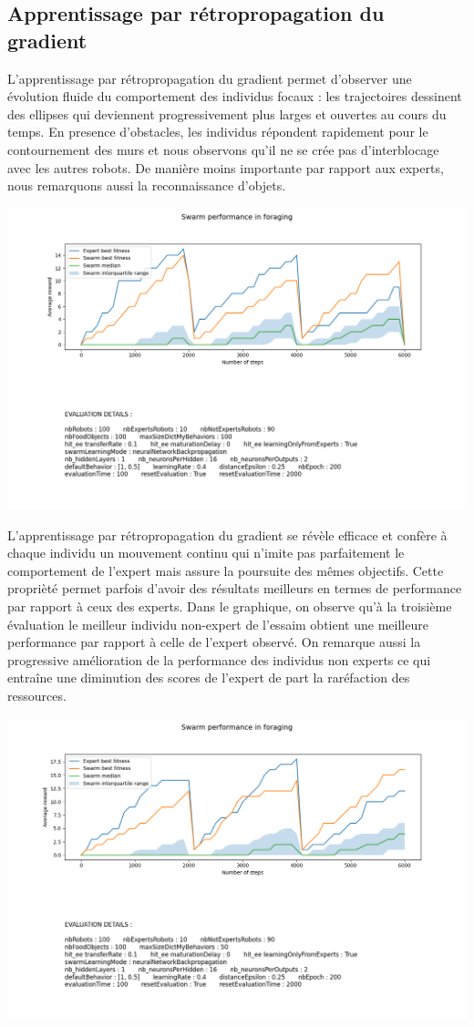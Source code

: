 \documentclass[a4paper, 12pt]{report}
\begin{document}
	
	
    \subsection{Apprentissage par rétropropagation du gradient}
    L'apprentissage par rétropropagation du gradient permet d'observer une évolution fluide du comportement des individus focaux : les trajectoires dessinent des ellipses qui deviennent progressivement plus larges et ouvertes au cours du temps. En presence d'obstacles, les individus répondent rapidement pour le contournement des murs et nous observons qu'il ne se crée pas d'interblocage avec les autres robots. De manière moins importante par rapport aux experts, nous remarquons aussi la reconnaissance d'objets.
    
    \includegraphics[scale=0.5]{bp6000_100.png}
    
    L'apprentissage par rétropropagation du gradient se révèle efficace et confère à chaque individu un mouvement continu qui n'imite pas parfaitement le comportement de l'expert mais assure la poursuite des mêmes objectifs. Cette proprièté permet parfois d'avoir des résultats meilleurs en termes de performance par rapport à ceux des experts. 
    Dans le graphique, on observe qu'à la troisième évaluation le meilleur individu non-expert de l'essaim obtient une meilleure performance par rapport à celle de l'expert observé. On remarque aussi la progressive amélioration de la performance des individus non experts ce qui entraîne une diminution des scores de l'expert de part la raréfaction des ressources.


    \includegraphics[scale=0.5]{bp6000_50.png}
\end{document}
